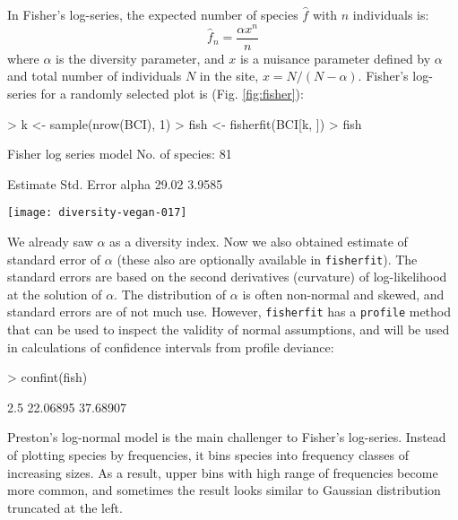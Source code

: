 \documentclass[a4paper,10pt]{amsart}
\begin{document}
In Fisher's log-series, the expected number of species $\hat f$ with $n$
individuals is:
\begin{equation}
\hat f_n = \frac{\alpha x^n}{n}
\end{equation}
where $\alpha$ is the diversity parameter, and $x$ is a nuisance
parameter defined by $\alpha$ and total number
of individuals $N$ in the site, $x = N/(N-\alpha)$.  Fisher's
log-series for a randomly selected plot is (Fig. \ref{fig:fisher}):
\begin{Schunk}
\begin{Sinput}
> k <- sample(nrow(BCI), 1)
> fish <- fisherfit(BCI[k, ])
> fish
\end{Sinput}
\begin{Soutput}
Fisher log series model
No. of species: 81 

      Estimate Std. Error
alpha    29.02     3.9585
\end{Soutput}
\end{Schunk}
\begin{SCfigure}
\texttt{[image: diversity-vegan-017]}
\caption{Fisher's log-series fitted to one randomly selected site
  (45).}
\label{fig:fisher}
\end{SCfigure}
We already saw $\alpha$ as a diversity index.  Now we also obtained
estimate of standard error of $\alpha$ (these also are optionally
available in \texttt{fisherfit}).  The standard errors are based on
the second derivatives (curvature) of log-likelihood at the solution
of $\alpha$.  The distribution of $\alpha$ is often non-normal
and skewed, and standard errors are of not much use.  However,
\texttt{fisherfit} has a \texttt{profile} method that can be used to
inspect the validity of normal assumptions, and will be used in
calculations of confidence intervals from profile deviance:
\begin{Schunk}
\begin{Sinput}
> confint(fish)
\end{Sinput}
\begin{Soutput}
   2.5 %   97.5 % 
22.06895 37.68907 
\end{Soutput}
\end{Schunk}

Preston's log-normal model is the main challenger to Fisher's
log-series.  Instead of plotting species by frequencies, it bins
species into frequency classes of increasing sizes.  As a result,
upper bins with high range of frequencies become more common, and
sometimes the result looks similar to Gaussian distribution truncated
at the left.
\end{document}
